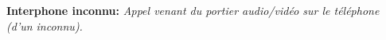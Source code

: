 \textbf{Interphone inconnu: } \textit{Appel venant du portier audio/vidéo sur le téléphone (d’un inconnu). }\newline 



 
